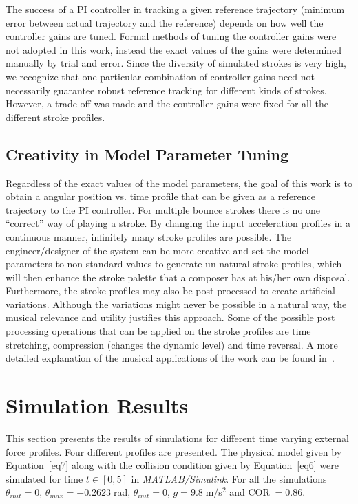 \documentclass[final,1p,times]{elsarticle}
\begin{document}
The success of a PI controller in tracking a given reference trajectory (minimum error
between actual trajectory and the reference) depends on how well the controller gains are tuned. Formal methods of tuning the controller gains were not adopted in this work, instead
the exact values of the gains were determined manually by trial and error. Since the diversity of simulated strokes is very high, we recognize that one particular combination of controller gains need not necessarily guarantee robust reference tracking for different kinds of strokes. However, a trade-off was made  and the controller gains were fixed for all the different stroke profiles. 

\subsection{Creativity in Model Parameter Tuning}
Regardless of the exact values of the model parameters, the goal
of this work is to obtain a angular position vs. time profile that can be given as a reference trajectory to the PI controller. For multiple bounce strokes there is no one ``correct'' way of playing a stroke. By changing the input acceleration profiles in a continuous manner, infinitely many stroke profiles are possible. The engineer/designer of the system can be more creative and set the model parameters to non-standard values to generate un-natural stroke profiles, which will then enhance the stroke palette that a composer has at his/her own disposal. Furthermore, the stroke profiles may also be post processed to create artificial variations. Although the variations might never be possible in a natural way, the musical relevance and utility justifies this approach. Some of the possible post processing operations that can be applied on the stroke profiles are time stretching, compression (changes the dynamic level) and time reversal. A more detailed explanation of the musical applications of the work can be found in~\cite{edakkattil2015enhancing}.

\section{Simulation Results}
This section presents the results of simulations for different time varying
external force profiles. Four different profiles are presented.
The physical model given by Equation~\ref{eq7} along with the collision condition given by Equation~\ref{eq6} were simulated for time $t \in [0,5]$ in \textit{MATLAB/Simulink}.
 For all the simulations $\theta_{init} = 0$, $\theta_{max} = -0.2623\;$rad, $\dot{\theta}_{init} = 0$,  $g = 9.8\;$m/s$^2$ and COR$\;=0.86$.
\end{document}
